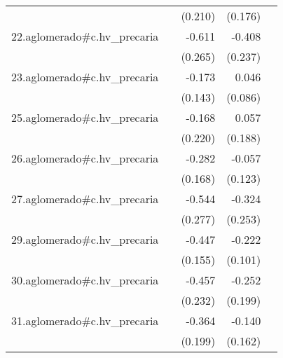 {\begin{longtable}{l*{4}{D{.}{.}{-1}}}
            &                     &     (0.210)         &     (0.176)         &                     \\
\addlinespace
22.aglomerado#c.hv\_precaria&                     &      -0.611\sym{*}  &      -0.408         &                     \\
            &                     &     (0.265)         &     (0.237)         &                     \\
\addlinespace
23.aglomerado#c.hv\_precaria&                     &      -0.173         &       0.046         &                     \\
            &                     &     (0.143)         &     (0.086)         &                     \\
\addlinespace
25.aglomerado#c.hv\_precaria&                     &      -0.168         &       0.057         &                     \\
            &                     &     (0.220)         &     (0.188)         &                     \\
\addlinespace
26.aglomerado#c.hv\_precaria&                     &      -0.282         &      -0.057         &                     \\
            &                     &     (0.168)         &     (0.123)         &                     \\
\addlinespace
27.aglomerado#c.hv\_precaria&                     &      -0.544\sym{*}  &      -0.324         &                     \\
            &                     &     (0.277)         &     (0.253)         &                     \\
\addlinespace
29.aglomerado#c.hv\_precaria&                     &      -0.447\sym{**} &      -0.222\sym{*}  &                     \\
            &                     &     (0.155)         &     (0.101)         &                     \\
\addlinespace
30.aglomerado#c.hv\_precaria&                     &      -0.457\sym{*}  &      -0.252         &                     \\
            &                     &     (0.232)         &     (0.199)         &                     \\
\addlinespace
31.aglomerado#c.hv\_precaria&                     &      -0.364         &      -0.140         &                     \\
            &                     &     (0.199)         &     (0.162)         &                     \\

\end{longtable}}
